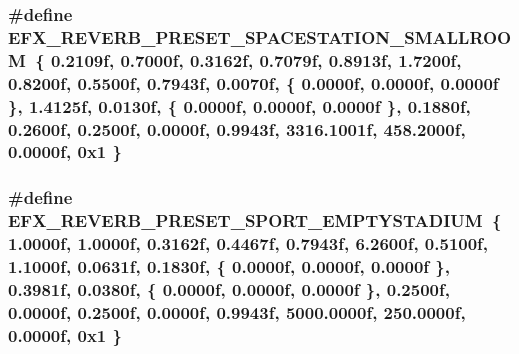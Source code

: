 \subsubsection[{\texorpdfstring{E\+F\+X\+\_\+\+R\+E\+V\+E\+R\+B\+\_\+\+P\+R\+E\+S\+E\+T\+\_\+\+S\+P\+A\+C\+E\+S\+T\+A\+T\+I\+O\+N\+\_\+\+S\+M\+A\+L\+L\+R\+O\+OM}{EFX_REVERB_PRESET_SPACESTATION_SMALLROOM}}]{\setlength{\rightskip}{0pt plus 5cm}\#define E\+F\+X\+\_\+\+R\+E\+V\+E\+R\+B\+\_\+\+P\+R\+E\+S\+E\+T\+\_\+\+S\+P\+A\+C\+E\+S\+T\+A\+T\+I\+O\+N\+\_\+\+S\+M\+A\+L\+L\+R\+O\+OM~\{ 0.\+2109f, 0.\+7000f, 0.\+3162f, 0.\+7079f, 0.\+8913f, 1.\+7200f, 0.\+8200f, 0.\+5500f, 0.\+7943f, 0.\+0070f, \{ 0.\+0000f, 0.\+0000f, 0.\+0000f \}, 1.\+4125f, 0.\+0130f, \{ 0.\+0000f, 0.\+0000f, 0.\+0000f \}, 0.\+1880f, 0.\+2600f, 0.\+2500f, 0.\+0000f, 0.\+9943f, 3316.\+1001f, 458.\+2000f, 0.\+0000f, 0x1 \}}\hypertarget{efx-presets_8h_a93b3631fec62a41f9698ce61cab40c46}{}\label{efx-presets_8h_a93b3631fec62a41f9698ce61cab40c46}
\subsubsection[{\texorpdfstring{E\+F\+X\+\_\+\+R\+E\+V\+E\+R\+B\+\_\+\+P\+R\+E\+S\+E\+T\+\_\+\+S\+P\+O\+R\+T\+\_\+\+E\+M\+P\+T\+Y\+S\+T\+A\+D\+I\+UM}{EFX_REVERB_PRESET_SPORT_EMPTYSTADIUM}}]{\setlength{\rightskip}{0pt plus 5cm}\#define E\+F\+X\+\_\+\+R\+E\+V\+E\+R\+B\+\_\+\+P\+R\+E\+S\+E\+T\+\_\+\+S\+P\+O\+R\+T\+\_\+\+E\+M\+P\+T\+Y\+S\+T\+A\+D\+I\+UM~\{ 1.\+0000f, 1.\+0000f, 0.\+3162f, 0.\+4467f, 0.\+7943f, 6.\+2600f, 0.\+5100f, 1.\+1000f, 0.\+0631f, 0.\+1830f, \{ 0.\+0000f, 0.\+0000f, 0.\+0000f \}, 0.\+3981f, 0.\+0380f, \{ 0.\+0000f, 0.\+0000f, 0.\+0000f \}, 0.\+2500f, 0.\+0000f, 0.\+2500f, 0.\+0000f, 0.\+9943f, 5000.\+0000f, 250.\+0000f, 0.\+0000f, 0x1 \}}\hypertarget{efx-presets_8h_a568154406051fd0d23820deac501404a}{}\label{efx-presets_8h_a568154406051fd0d23820deac501404a}
